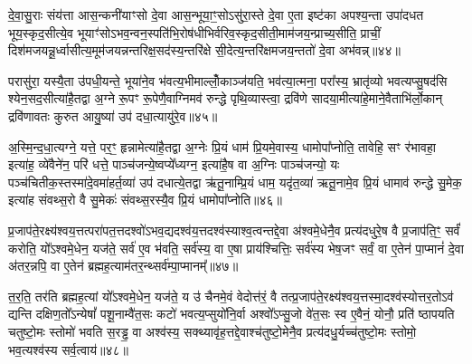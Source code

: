 {\anuvakamend[{ए॒वं प्रा॒प्नोत्या॑दि॒त्या अ॑र्धय॒त्येका॒न्नप॑ञ्चा॒शच्च॑॥10॥}]}

दे॒वा॒सु॒राः संय॑त्ता आस॒न्कनी॑याꣳसो दे॒वा आस॒न्भूया॒ꣳ॒सो\-ऽसु॑रा॒स्ते दे॒वा ए॒ता इष्ट॑का अपश्य॒न्ता उपा॑दधत भूय॒स्कृद॒सीत्ये॒व भूयाꣳ॑सो\-ऽभव॒न्वन॒स्पति॑भि॒रोष॑धीभिर्वरिव॒स्कृद॒सीती॒माम॑जय॒न्प्राच्य॒सीति॒ प्राचीं॒ दिश॑मजयन्नू॒र्ध्वासीत्य॒मूम॑जयन्नन्तरिक्ष॒सद॑स्य॒न्तरि॑क्षे सी॒देत्य॒न्तरि॑क्षमजय॒न्ततो॑ दे॒वा अभ॑वन्न्॥४४॥

परासु॑रा॒ यस्यै॒ता उ॑पधी॒यन्ते॒ भूया॑ने॒व भ॑वत्य॒भीमाल्लोँ॒काञ्ज॑यति॒ भव॑त्या॒त्मना॒ परा᳚स्य॒ भ्रातृ॑व्यो भवत्यप्सु॒षद॑सि श्येन॒सद॒सीत्या॑है॒तद्वा अ॒ग्ने रू॒पꣳ रू॒पेणै॒वाग्निमव॑ रुन्द्धे पृथि॒व्यास्त्वा॒ द्रवि॑णे सादया॒मीत्या॑हे॒माने॒वैताभि॑र्लो॒कान् द्रवि॑णावतः कुरुत आयु॒ष्या॑ उप॑ दधा॒त्यायु॑रे॒व॥४५॥

अ॒स्मि॒न्द॒धा॒त्यग्ने॒ यत्ते॒ पर॒ꣳ॒ हृन्नामेत्या॑है॒तद्वा अ॒ग्नेः प्रि॒यं धाम॑ प्रि॒यमे॒वास्य॒ धामोपा᳚प्नोति॒ तावेहि॒ सꣳ र॑भावहा॒ इत्या॑ह॒ व्ये॑वैने॑न॒ परि॑ धत्ते॒ पाञ्च॑जन्ये॒ष्वप्ये᳚ध्यग्न॒ इत्या॑है॒ष वा अ॒ग्निः पाञ्च॑जन्यो॒ यः पञ्च॑चितीक॒स्तस्मा॑दे॒वमा॑हर्त॒व्या॑ उप॑ दधात्ये॒तद्वा ऋ॑तू॒नाम्प्रि॒यं धाम॒ यदृ॑त॒व्या॑ ऋतू॒नामे॒व प्रि॒यं धामाव॑ रुन्द्धे सु॒मेक॒ इत्या॑ह संवथ्स॒रो वै सु॒मेकः॑ संवथ्स॒रस्यै॒व प्रि॒यं धामोपा᳚प्नोति॥४६॥

{\anuvakamend[{अभ॑व॒न्नायु॑रे॒वर्त॒व्या॑ उप॒ षड्विꣳ॑शतिश्च॥11॥}]}

प्र॒जाप॑ते॒रक्ष्य॑श्वय॒त्तत्परा॑पत॒त्तदश्वो॑\-ऽभव॒द्यदश्व॑य॒त्तदश्व॑स्याश्व॒त्वन्तद्दे॒वा अ॑श्वमे॒धेनै॒व प्रत्य॑दधुरे॒ष वै प्र॒जाप॑ति॒ꣳ॒ सर्वं॑ करोति॒ यो᳚\-ऽश्वमे॒धेन॒ यज॑ते॒ सर्व॑ ए॒व भ॑वति॒ सर्व॑स्य॒ वा ए॒षा प्राय॑श्चित्तिः॒ सर्व॑स्य भेष॒जꣳ सर्वं॒ वा ए॒तेन॑ पा॒प्मानं॑ दे॒वा अ॑तर॒न्नपि॒ वा ए॒तेन॑ ब्रह्मह॒त्याम॑तर॒न्थ्सर्व॑म्पा॒प्मानम्᳚॥४७॥

त॒र॒ति॒ तर॑ति ब्रह्मह॒त्यां यो᳚\-ऽश्वमे॒धेन॒ यज॑ते॒ य उ॑ चैनमे॒वं वेदोत्त॑रं॒ वै तत्प्र॒जाप॑ते॒रक्ष्य॑श्वय॒त्तस्मा॒दश्व॑स्योत्तर॒तो\-ऽव॑ द्यन्ति दक्षिण॒तो᳚\-ऽन्येषां᳚ पशू॒नाम्वै॑त॒सः कटो॑ भवत्य॒प्सुयो॑नि॒र्वा अश्वो᳚\-ऽप्सु॒जो वे॑त॒सः स्व ए॒वैनं॒ योनौ॒ प्रति॑ ष्ठापयति चतुष्टो॒मः स्तोमो॑ भवति स॒रड्ढ॒ वा अश्व॑स्य॒ सक्थ्यावृ॑ह॒त्तद्दे॒वाश्च॑तुष्टो॒मेनै॒व प्रत्य॑दधु॒र्यच्च॑तुष्टो॒मः स्तोमो॒ भव॒त्यश्व॑स्य सर्व॒त्वाय॑॥४८॥

{\anuvakamend[{सर्वं॑ पा॒प्मान॑मवृह॒द्द्वाद॑श च॥12॥}]}


{}

